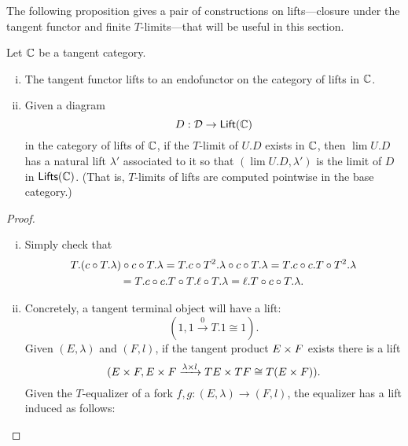 The following proposition gives a pair of constructions on lifts---closure under the tangent functor and finite $T$-limits---that will be useful in this section.
\begin{lemma}%
  \label{lem:T-limits-of-lifts}
  Let $\mathbb{C}$ be a tangent category.
  ~\begin{enumerate}[(i)]
    \item The tangent functor lifts to an endofunctor on the category of lifts in $\mathbb{C}$.
    \item Given a diagram 
    \[ D: \mathcal{D} \to \mathsf{Lift}(\mathbb{C})\]
    in the category of lifts of $\mathbb{C}$, if the $T$-limit of $U.D$ exists in $\mathbb{C}$, then $\lim U.D$ has a natural lift $\lambda'$ associated to it so that $(\lim U.D, \lambda')$ is the limit of $D$ in $\mathsf{Lifts}(\mathbb{C})$. (That is, $T$-limits of lifts are computed pointwise in the base category.)
  \end{enumerate}
\end{lemma}
\begin{proof}
  ~\begin{enumerate}[(i)]
    \item Simply check that 
    \begin{gather*}
      T.(c \circ T.\lambda) \circ c \circ T.\lambda = T.c \circ T^2.\lambda \circ c \circ T.\lambda  = T.c \circ c.T \circ T^2.\lambda  \\= T.c \circ c.T \circ T.\ell \circ T.\lambda = \ell.T \circ c \circ T.\lambda. 
    \end{gather*}
    \item 
    Concretely, a tangent terminal object will have a lift:
    \[
        (1, 1 \xrightarrow[]{0} T.1 \cong 1).
    \] 
    Given $(E,\lambda)$ and $(F,l)$, if the tangent product $E \times F$ exists there is a lift
    \[
      (E \times F, E \times F \xrightarrow[]{\lambda \times l} TE \times TF \cong T(E \times F)).
    \]
    Given the $T$-equalizer of a fork $f,g:(E,\lambda) \to (F,l)$, the equalizer has a lift induced as follows:
    \[
      
    \]
  \end{enumerate}
\end{proof}
